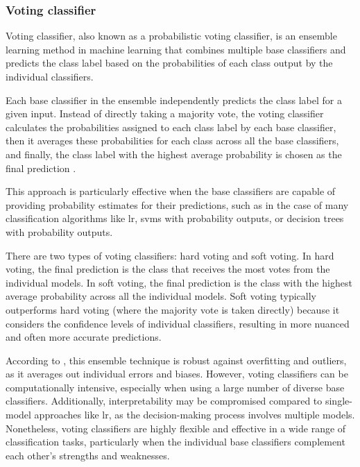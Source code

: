\subsubsection{Voting classifier}
\label{subsubsec:machine_learning_voting_classifer}

Voting classifier, also known as a probabilistic voting classifier, is an ensemble learning method in machine learning that combines multiple base classifiers and predicts the class label based on the probabilities of each class output by the individual classifiers.

Each base classifier in the ensemble independently predicts the class label for a given input. Instead of directly taking a majority vote, the voting classifier calculates the probabilities assigned to each class label by each base classifier, then it averages these probabilities for each class across all the base classifiers, and finally, the class label with the highest average probability is chosen as the final prediction \cite{Sarkar2019}.

This approach is particularly effective when the base classifiers are capable of providing probability estimates for their predictions, such as in the case of many classification algorithms like \gls{lr}, \gls{svm}s with probability outputs, or decision trees with probability outputs.

There are two types of voting classifiers: hard voting and soft voting. In hard voting, the final prediction is the class that receives the most votes from the individual models. In soft voting, the final prediction is the class with the highest average probability across all the individual models. Soft voting typically outperforms hard voting (where the majority vote is taken directly) because it considers the confidence levels of individual classifiers, resulting in more nuanced and often more accurate predictions.

According to \textcite{Sarkar2019}, this ensemble technique is robust against overfitting and outliers, as it averages out individual errors and biases. However, voting classifiers can be computationally intensive, especially when using a large number of diverse base classifiers. Additionally, interpretability may be compromised compared to single-model approaches like \gls{lr}, as the decision-making process involves multiple models. Nonetheless, voting classifiers are highly flexible and effective in a wide range of classification tasks, particularly when the individual base classifiers complement each other's strengths and weaknesses.


